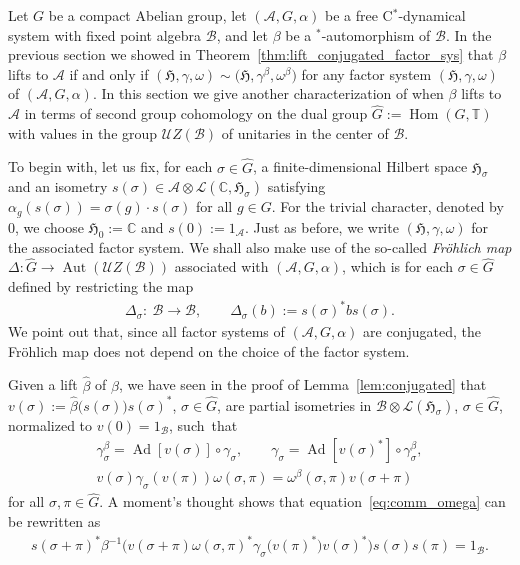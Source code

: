 \documentclass[10pt,a4paper]{amsart}
\numberwithin{equation}{section}
\newcommand*{\C}{\mathbb C}		%
\newcommand*{\tensor}{\otimes}		%
\DeclareMathOperator{\Ad}{Ad}		%
\DeclareMathOperator{\Aut}{Aut}
\DeclareMathOperator{\Hom}{Hom}
\newcommand*{\Star}{$^*$\nobreakdash}
\newcommand*{\hilb}{\mathfrak}		%
\newcommand*{\alg}{\mathcal}		%
\newcommand*{\hH}{\hilb{H}}			%
\newcommand*{\one}{1}				%
\newcommand*{\aA}{\alg{A}}			%
\newcommand*{\aB}{\alg{B}} 			%
\newcommand*{\End}{\mathcal{L}} %
\begin{document}
Let $G$ be a compact Abelian group, let $(\aA, G, \alpha)$ be a free C\Star-dynamical system with fixed point algebra $\aB$, and let $\beta$ be a \Star-automorphism of $\aB$.
In the previous section we showed in Theorem~\ref{thm:lift_conjugated_factor_sys} that $\beta$ lifts to $\aA$ if and only if $(\hH,\gamma, \omega) \sim \big(\hH, \gamma^\beta, \omega^\beta\big)$ for any factor system $(\hH, \gamma, \omega)$ of $(\aA, G, \alpha)$.
In this section we give another characterization of when $\beta$ lifts to $\aA$ in terms of second group cohomology on the dual group $\hat G := \Hom(G,\mathbb{T})$ with values in the group $\mathcal{U}Z(\aB)$ of unitaries in the center of $\aB$.

To begin with, let us fix, for each $\sigma \in \hat G$, a finite-dimensional Hilbert space $\hH_\sigma$ and an isometry $s(\sigma)\in \aA \tensor \End(\C,\hH_\sigma)$ satisfying $\alpha_g(s(\sigma)) = \sigma(g) \cdot s(\sigma)$ for all $g \in G$.
For the trivial character, denoted by $0$, we choose $\hH_0 := \C$ and $s(0) := \one_\aA$.
Just as before, we write $(\hH, \gamma, \omega)$ for the associated factor system.
We shall also make use of the so-called \emph{Fr\"ohlich map} \mbox{$\Delta\colon \hat G \to \Aut ( \mathcal{U}Z(\aB) )$} associated with $(\aA, G, \alpha)$, which is for each $\sigma \in \hat G$ defined by restricting the map
\begin{gather*}
	\Delta_\sigma\colon \ \aB \to \aB,
	\qquad \Delta_\sigma(b) := s(\sigma)^* b s(\sigma).
\end{gather*}
We point out that, since all factor systems of $(\aA, G, \alpha)$ are conjugated, the Fr\"ohlich map does not depend on the choice of the factor system.

Given a lift $\hat \beta$ of $\beta$, we have seen in the proof of Lemma~\ref{lem:conjugated} that $v(\sigma) := \hat \beta\big( s(\sigma) \big) s(\sigma)^*$, $\sigma \in \hat G$, are partial isometries in $\aB \tensor \End(\hH_\sigma)$, $\sigma \in \hat G$, normalized to $v(0)=\one_\aB$, such~that
\begin{gather}	\label{eq:comm_gamma}
	\gamma^\beta_\sigma = \Ad[v(\sigma)] \circ \gamma_\sigma,
	\qquad
	\gamma_\sigma = \Ad[v(\sigma)^*] \circ \gamma_\sigma^\beta,
	\\
	v(\sigma) \gamma_\sigma( v(\pi)) \omega(\sigma, \pi)
	= \omega^\beta(\sigma, \pi) v(\sigma + \pi)
	\label{eq:comm_omega}
\end{gather}
for all $\sigma, \pi \in \hat G$.
A moment's thought shows that equation~\eqref{eq:comm_omega} can be rewritten as
\begin{gather*}
	s(\sigma + \pi)^* \beta^{-1}\big( v(\sigma + \pi) \omega(\sigma,\pi)^* \gamma_\sigma\big(v(\pi)^*\big) v(\sigma)^*\big) s(\sigma) s(\pi) = \one_\aB.
\end{gather*}
\end{document}
